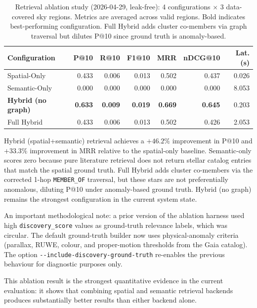 \documentclass[12pt]{elsarticle}
\begin{document}
\begin{table}[htbp]
\centering
\caption{Retrieval ablation study (2026-04-29, leak-free): 4 configurations $\times$ 3 data-covered sky regions. Metrics are averaged across valid regions. Bold indicates best-performing configuration. Full Hybrid adds cluster co-members via graph traversal but dilutes P@10 since ground truth is anomaly-based.}
\label{tab:ablation}
\begin{tabular}{lrrrrrr}
\toprule
\textbf{Configuration} & \textbf{P@10} & \textbf{R@10} & \textbf{F1@10} & \textbf{MRR} & \textbf{nDCG@10} & \textbf{Lat. (s)} \\
\midrule
Spatial-Only                    & 0.433 & 0.006 & 0.013 & 0.502 & 0.437 & 0.026 \\
Semantic-Only                   & 0.000 & 0.000 & 0.000 & 0.000 & 0.000 & 8.053 \\
\textbf{Hybrid (no graph)}      & \textbf{0.633} & \textbf{0.009} & \textbf{0.019} & \textbf{0.669} & \textbf{0.645} & 0.203 \\
Full Hybrid                     & 0.433 & 0.006 & 0.013 & 0.502 & 0.426 & 2.053 \\
\bottomrule
\end{tabular}
\end{table}

\noindent
Hybrid (spatial+semantic) retrieval achieves a $+46.2\%$ improvement in P@10 and $+33.3\%$ improvement in MRR relative to the spatial-only baseline. Semantic-only scores zero because pure literature retrieval does not return stellar catalog entries that match the spatial ground truth. Full Hybrid adds cluster co-members via the corrected 1-hop \texttt{MEMBER\allowbreak\_OF} traversal, but these stars are not preferentially anomalous, diluting P@10 under anomaly-based ground truth. Hybrid (no graph) remains the strongest configuration in the current system state.

An important methodological note: a prior version of the ablation harness used high \texttt{discovery\allowbreak\_score} values as ground-truth relevance labels, which was circular. The default ground-truth builder now uses physical-anomaly criteria (parallax, RUWE, colour, and proper-motion thresholds from the Gaia catalog). The option \texttt{-{}-include-\allowbreak discovery-\allowbreak ground-truth} re-enables the previous behaviour for diagnostic purposes only.

This ablation result is the strongest quantitative evidence in the current evaluation: it shows that combining spatial and semantic retrieval backends produces substantially better results than either backend alone.
\end{document}
